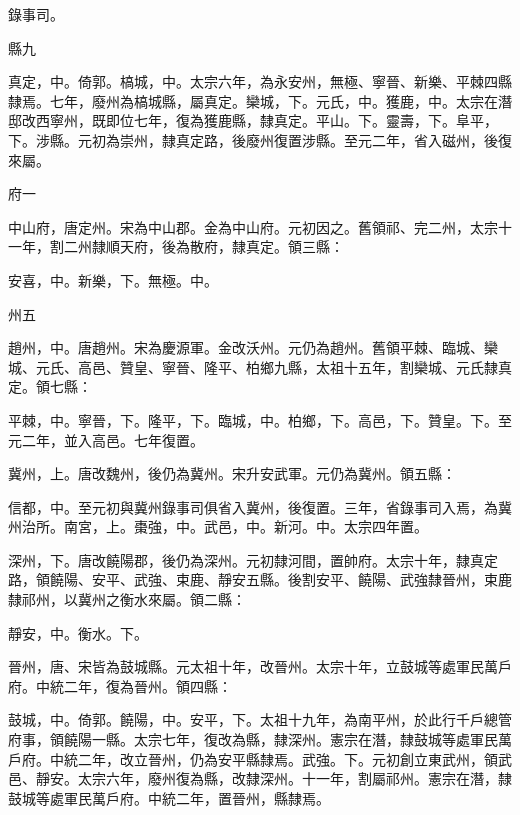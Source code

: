 \begin{pinyinscope}
 錄事司。



 縣九



 真定，中。倚郭。槁城，中。太宗六年，為永安州，無極、寧晉、新樂、平棘四縣隸焉。七年，廢州為槁城縣，屬真定。欒城，下。元氏，中。獲鹿，中。太宗在潛邸改西寧州，既即位七年，復為獲鹿縣，隸真定。平山。下。靈壽，下。阜平，下。涉縣。元初為崇州，隸真定路，後廢州復置涉縣。至元二年，省入磁州，後復來屬。



 府一



 中山府，唐定州。宋為中山郡。金為中山府。元初因之。舊領祁、完二州，太宗十一年，割二州隸順天府，後為散府，隸真定。領三縣：



 安喜，中。新樂，下。無極。中。



 州五



 趙州，中。唐趙州。宋為慶源軍。金改沃州。元仍為趙州。舊領平棘、臨城、欒城、元氏、高邑、贊皇、寧晉、隆平、柏鄉九縣，太祖十五年，割欒城、元氏隸真定。領七縣：



 平棘，中。寧晉，下。隆平，下。臨城，中。柏鄉，下。高邑，下。贊皇。下。至元二年，並入高邑。七年復置。



 冀州，上。唐改魏州，後仍為冀州。宋升安武軍。元仍為冀州。領五縣：



 信都，中。至元初與冀州錄事司俱省入冀州，後復置。三年，省錄事司入焉，為冀州治所。南宮，上。棗強，中。武邑，中。新河。中。太宗四年置。



 深州，下。唐改饒陽郡，後仍為深州。元初隸河間，置帥府。太宗十年，隸真定路，領饒陽、安平、武強、束鹿、靜安五縣。後割安平、饒陽、武強隸晉州，束鹿隸祁州，以冀州之衡水來屬。領二縣：



 靜安，中。衡水。下。



 晉州，唐、宋皆為鼓城縣。元太祖十年，改晉州。太宗十年，立鼓城等處軍民萬戶府。中統二年，復為晉州。領四縣：



 鼓城，中。倚郭。饒陽，中。安平，下。太祖十九年，為南平州，於此行千戶總管府事，領饒陽一縣。太宗七年，復改為縣，隸深州。憲宗在潛，隸鼓城等處軍民萬戶府。中統二年，改立晉州，仍為安平縣隸焉。武強。下。元初創立東武州，領武邑、靜安。太宗六年，廢州復為縣，改隸深州。十一年，割屬祁州。憲宗在潛，隸鼓城等處軍民萬戶府。中統二年，置晉州，縣隸焉。




\end{pinyinscope}
